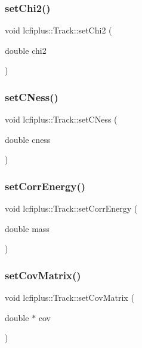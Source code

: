 \subsubsection{set\+Chi2()}
{\footnotesize\ttfamily void lcfiplus\+::\+Track\+::set\+Chi2 (\begin{DoxyParamCaption}\item[{double}]{chi2 }\end{DoxyParamCaption})\hspace{0.3cm}{\ttfamily [inline]}}

\mbox{\label{classlcfiplus_1_1Track_ae5d693a15d046637baa73dc41030b815}} 
\subsubsection{set\+C\+Ness()}
{\footnotesize\ttfamily void lcfiplus\+::\+Track\+::set\+C\+Ness (\begin{DoxyParamCaption}\item[{double}]{cness }\end{DoxyParamCaption})\hspace{0.3cm}{\ttfamily [inline]}}

\mbox{\label{classlcfiplus_1_1Track_a409746053147dc1b271018a2985dd0a5}} 
\subsubsection{set\+Corr\+Energy()}
{\footnotesize\ttfamily void lcfiplus\+::\+Track\+::set\+Corr\+Energy (\begin{DoxyParamCaption}\item[{double}]{mass }\end{DoxyParamCaption})\hspace{0.3cm}{\ttfamily [inline]}}

\mbox{\label{classlcfiplus_1_1Track_a72086a825c760a5910f794b8b8ee0ec1}} 
\subsubsection{set\+Cov\+Matrix()}
{\footnotesize\ttfamily void lcfiplus\+::\+Track\+::set\+Cov\+Matrix (\begin{DoxyParamCaption}\item[{double $\ast$}]{cov }\end{DoxyParamCaption})}



